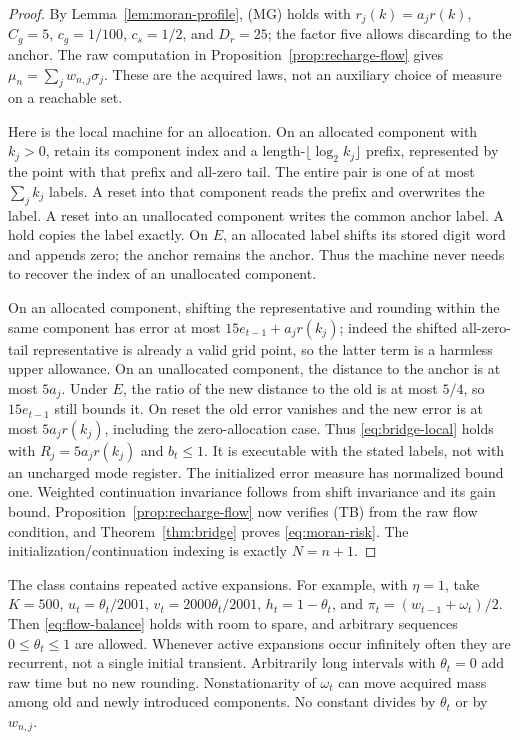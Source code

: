 \begin{proof}
By Lemma~\ref{lem:moran-profile}, \textup{(MG)} holds with $r_j(k)=a_jr(k)$, $C_g=5$, $c_g=1/100$, $c_s=1/2$, and $D_r=25$; the factor five allows discarding to the anchor. The raw computation in Proposition~\ref{prop:recharge-flow} gives
$\mu_n=\sum_jw_{n,j}\sigma_j$. These are the acquired laws, not an auxiliary choice of measure on a reachable set.

Here is the local machine for an allocation. On an allocated component with $k_j>0$, retain its component index and a length-$\lfloor\log_2k_j\rfloor$ prefix, represented by the point with that prefix and all-zero tail. The entire pair is one of at most $\sum_j k_j$ labels. A reset into that component reads the prefix and overwrites the label. A reset into an unallocated component writes the common anchor label. A hold copies the label exactly. On $E$, an allocated label shifts its stored digit word and appends zero; the anchor remains the anchor. Thus the machine never needs to recover the index of an unallocated component.

On an allocated component, shifting the representative and rounding within the same component has error at most $15e_{t-1}+a_jr(k_j)$; indeed the shifted all-zero-tail representative is already a valid grid point, so the latter term is a harmless upper allowance. On an unallocated component, the distance to the anchor is at most $5a_j$. Under $E$, the ratio of the new distance to the old is at most $5/4$, so $15e_{t-1}$ still bounds it. On reset the old error vanishes and the new error is at most $5a_jr(k_j)$, including the zero-allocation case. Thus \eqref{eq:bridge-local} holds with $R_j=5a_jr(k_j)$ and $b_t\le1$. It is executable with the stated labels, not with an uncharged mode register. The initialized error measure has normalized bound one. Weighted continuation invariance follows from shift invariance and its gain bound. Proposition~\ref{prop:recharge-flow} now verifies \textup{(TB)} from the raw flow condition, and Theorem~\ref{thm:bridge} proves \eqref{eq:moran-risk}. The initialization/continuation indexing is exactly $N=n+1$.
\end{proof}

The class contains repeated active expansions. For example, with $\eta=1$, take $K=500$, $u_t=\theta_t/2001$, $v_t=2000\theta_t/2001$, $h_t=1-\theta_t$, and $\pi_t=(w_{t-1}+\omega_t)/2$. Then \eqref{eq:flow-balance} holds with room to spare, and arbitrary sequences $0\le\theta_t\le1$ are allowed. Whenever active expansions occur infinitely often they are recurrent, not a single initial transient. Arbitrarily long intervals with $\theta_t=0$ add raw time but no new rounding. Nonstationarity of $\omega_t$ can move acquired mass among old and newly introduced components. No constant divides by $\theta_t$ or by $w_{n,j}$.

